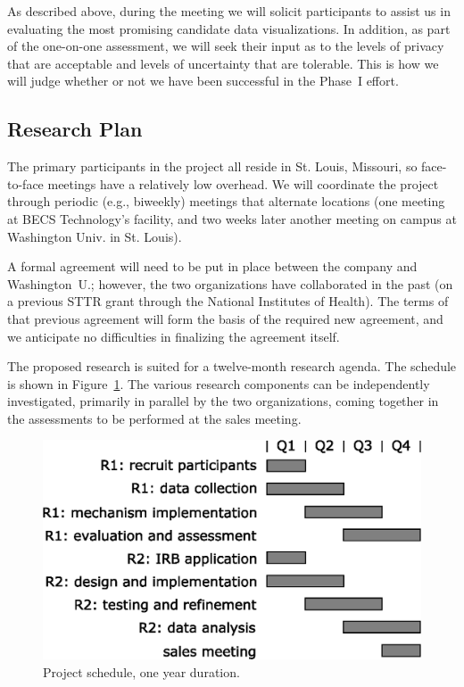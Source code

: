As described above, during the meeting we will solicit participants
to assist us in evaluating the most promising candidate data visualizations.
In addition, as part of the one-on-one assessment, we will seek their
input as to the levels of privacy that are acceptable and levels of 
uncertainty that are tolerable.
This is how we will judge whether or not we have been successful
in the Phase~I effort.

\subsection{Research Plan}
\label{sec:plan}

The primary participants in the project all reside in St. Louis, Missouri,
so face-to-face meetings have a relatively low overhead. We will coordinate
the project through periodic (e.g., biweekly) meetings that alternate
locations (one meeting at BECS Technology's facility, and two weeks later
another meeting on campus at Washington Univ. in St. Louis).


A formal agreement will need to be put in place between the company and
Washington~U.; however, the two organizations have collaborated in the
past (on a previous STTR grant through the National Institutes of Health).
The terms of that previous agreement will form the
basis of the required new agreement, and we anticipate no difficulties
in finalizing the agreement itself.

The proposed research is suited for a twelve-month research agenda.
The schedule is shown in Figure~\ref{fig:gantt}.
The various research components can be independently investigated,
primarily in parallel by the two organizations, coming together
in the assessments to be performed at the sales meeting.

\begin{figure}[h]
 \center
\includegraphics[width=0.5\columnwidth]{gantt}
    \caption{Project schedule, one year duration.}
    \label{fig:gantt}
\end{figure}

